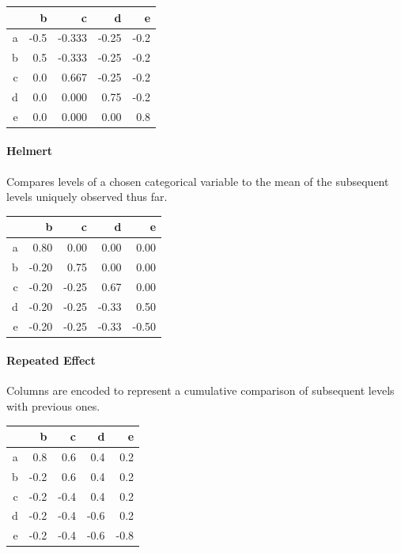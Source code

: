 \documentclass{article}
\theoremstyle{plain}
\theoremstyle{definition}
\theoremstyle{remark}
\begin{document}
\begin{table}[H]
	\centering
	\begin{tabular}{rrrrr}
		\hline
		& b & c & d & e \\
		\hline
		a & -0.5 &-0.333& -0.25& -0.2\\
		b &  0.5 &-0.333& -0.25& -0.2\\
		c &  0.0 & 0.667& -0.25& -0.2\\
		d & 0.0 & 0.000 & 0.75 &-0.2\\
		e &  0.0&  0.000&  0.00&  0.8\\
		\hline
	\end{tabular}
\end{table}

\paragraph{Helmert} Compares levels of a chosen categorical variable to the mean of the subsequent levels uniquely observed thus far.

\begin{table}[H]
	\centering
	\begin{tabular}{rrrrr}
		\hline
		& b & c & d & e \\
		\hline
		a & 0.80 & 0.00 & 0.00 & 0.00 \\
		b & -0.20 & 0.75 & 0.00 & 0.00 \\
		c & -0.20 & -0.25 & 0.67 & 0.00 \\
		d & -0.20 & -0.25 & -0.33 & 0.50 \\
		e & -0.20 & -0.25 & -0.33 & -0.50 \\
		\hline
	\end{tabular}
\end{table}


\paragraph{Repeated Effect} Columns are encoded to represent a cumulative comparison of subsequent levels with previous ones.

\begin{table}[H]
	\centering
	\begin{tabular}{rrrrr}
		\hline
		& b & c & d & e \\
		\hline
		a & 0.8 & 0.6 & 0.4 & 0.2\\
		b & -0.2 & 0.6 & 0.4&  0.2\\
		c & -0.2& -0.4 & 0.4 & 0.2\\
		d & -0.2 &-0.4& -0.6&  0.2\\
		e & -0.2& -0.4& -0.6 &-0.8\\
		\hline
	\end{tabular}
\end{table}
\end{document}

